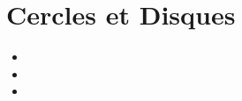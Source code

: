 \chapter{Cercles et Disques}\label{ChCerclesEtDisques}

\vspace{5cm}
\begin{acquis}
\begin{itemize}
\item 
\item 
\item 
\end{itemize}
\end{acquis}


\activites


\cours
%

\exercicesbase
\begin{colonne*exercice}
%
\end{colonne*exercice}


\exercicesappr
\begin{colonne*exercice}
%
\end{colonne*exercice}

\connaissances
%

\TravauxPratiques
%

\recreation %
%


